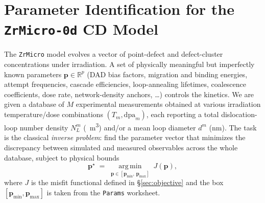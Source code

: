 \documentclass{article}
\newcommand{\R}{\mathbb{R}}
\newcommand{\param}{\bm{p}}
\newcommand{\dpa}{\mathrm{dpa}}
\newcommand{\NL}{N_{L}}
\begin{document}
\section{Parameter Identification for the \texttt{ZrMicro-0d} CD Model} \label{app:B}


The \texttt{ZrMicro} model evolves a vector of point-defect and defect-cluster
concentrations under irradiation. A set of physically meaningful but imperfectly
known parameters $\param\in\R^{p}$ (DAD bias factors, migration and binding energies,
attempt frequencies, cascade efficiencies, loop-annealing lifetimes, coalescence
coefficients, dose rate, network-density anchors, \dots) controls the kinetics. We are given
a database of $M$ experimental measurements obtained at various irradiation
temperature/dose combinations $(T_m,\dpa_m)$, each reporting a total dislocation-loop
number density $\NL^{m}$ (\si{\per\cubic\metre}) and/or a mean loop diameter
$d^{m}$ (\si{\nano\metre}). The task is the classical \emph{inverse problem}:
find the parameter vector that minimizes the discrepancy between simulated and
measured observables across the whole database, subject to physical bounds
\begin{equation}
  \param^{\star}
  \;=\;\operatorname*{arg\,min}_{\param\in[\param_{\min},\,\param_{\max}]}
  \; J(\param),
  \label{eq:problem}
\end{equation}
where $J$ is the misfit functional defined in \S\ref{sec:objective} and the box
$[\param_{\min},\param_{\max}]$ is taken from the \texttt{Params} worksheet.
\end{document}

